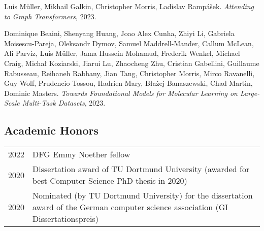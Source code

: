 \documentclass[11pt, a4paper, DIV=14, headings=small]{scrartcl}
\begin{document}
\begin{thebibliography}{15}
		Luis Müller, Mikhail Galkin, Christopher Morris, Ladislav Rampášek.
		\emph{Attending to Graph Transformers}, 2023.
		
		Dominique Beaini, Shenyang Huang, Joao Alex Cunha, Zhiyi Li,
Gabriela Moisescu-Pareja, Oleksandr Dymov, Samuel Maddrell-Mander,
Callum McLean, Ali Parviz, Luis Müller, Jama Hussein Mohamud,
Frederik Wenkel, Michael Craig, Michał Koziarski, Jiarui Lu, 
Zhaocheng Zhu, Cristian Gabellini, Guillaume Rabusseau,
Reihaneh Rabbany, Jian Tang, Christopher Morris, Mirco Ravanelli,
Guy Wolf, Prudencio Tossou, Hadrien Mary,
B\l{}a\.z{}ej Banaszewski, Chad Martin, Dominic Masters.
		\emph{Towards Foundational Models for Molecular Learning on Large-Scale Multi-Task Datasets}, 2023.
	\end{thebibliography}
	
	\subsection*{Academic Honors}
	\tabulinesep=0.8mm
	\begin{longtabu}{p{2.1cm}p{12.0cm}}
		2022 & DFG Emmy Noether fellow                                                                                                             \\
		2020 & Dissertation award of TU Dortmund University (awarded for best Computer Science PhD thesis in 2020)                                 \\
		2020 & Nominated (by TU Dortmund University) for the dissertation award of the German computer science association (GI Dissertationspreis) \\
	\end{longtabu}
	
\end{document}
